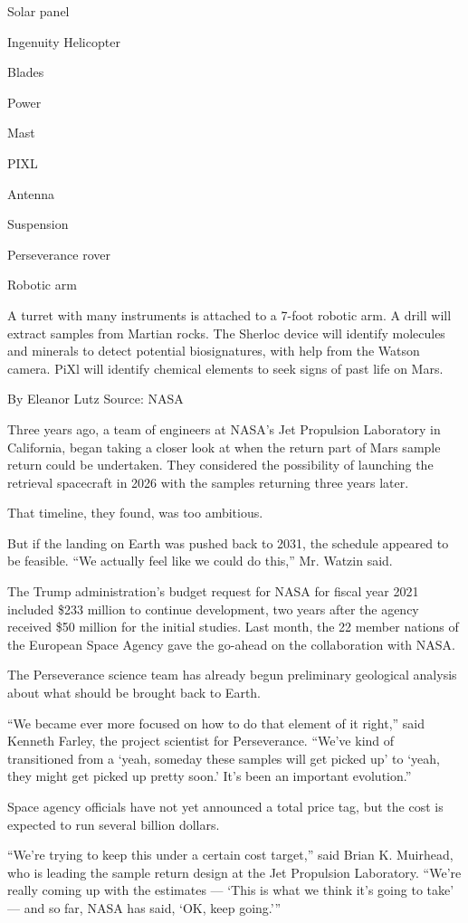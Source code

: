 Solar panel

Ingenuity Helicopter

Blades

Power

Mast

PIXL

Antenna

Suspension

Perseverance rover

Robotic arm

A turret with many instruments is attached to a 7-foot robotic arm. A
drill will extract samples from Martian rocks. The Sherloc device will
identify molecules and minerals to detect potential biosignatures, with
help from the Watson camera. PiXl will identify chemical elements to
seek signs of past life on Mars.

By Eleanor Lutz \textbar{} Source: NASA

Three years ago, a team of engineers at NASA's Jet Propulsion Laboratory
in California, began taking a closer look at when the return part of
Mars sample return could be undertaken. They considered the possibility
of launching the retrieval spacecraft in 2026 with the samples returning
three years later.

That timeline, they found, was too ambitious.

But if the landing on Earth was pushed back to 2031, the schedule
appeared to be feasible. ``We actually feel like we could do this,'' Mr.
Watzin said.

The Trump administration's budget request for NASA for fiscal year 2021
included \$233 million to continue development, two years after the
agency received \$50 million for the initial studies. Last month, the 22
member nations of the European Space Agency gave the go-ahead on the
collaboration with NASA.

The Perseverance science team has already begun preliminary geological
analysis about what should be brought back to Earth.

``We became ever more focused on how to do that element of it right,''
said Kenneth Farley, the project scientist for Perseverance. ``We've
kind of transitioned from a `yeah, someday these samples will get picked
up' to `yeah, they might get picked up pretty soon.' It's been an
important evolution.''

Space agency officials have not yet announced a total price tag, but the
cost is expected to run several billion dollars.

``We're trying to keep this under a certain cost target,'' said Brian K.
Muirhead, who is leading the sample return design at the Jet Propulsion
Laboratory. ``We're really coming up with the estimates --- `This is
what we think it's going to take' --- and so far, NASA has said, `OK,
keep going.'''

